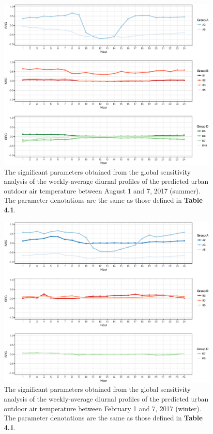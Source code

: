 \begin{figure}[h]
\centering
\includegraphics[width=.875\linewidth]{Figure5-2.eps}
\caption{The significant parameters obtained from the global sensitivity analysis of the weekly-average diurnal profiles of the predicted urban outdoor air temperature between August 1 and 7, 2017 (summer). The parameter denotations are the same as those defined in \textbf{Table 4.1}.}
\end{figure}

\begin{figure}[h]
\centering
\includegraphics[width=.875\linewidth]{Figure5-3.eps}
\caption{The significant parameters obtained from the global sensitivity analysis of the weekly-average diurnal profiles of the predicted urban outdoor air temperature between February 1 and 7, 2017 (winter). The parameter denotations are the same as those defined in \textbf{Table 4.1}.}
\end{figure}

